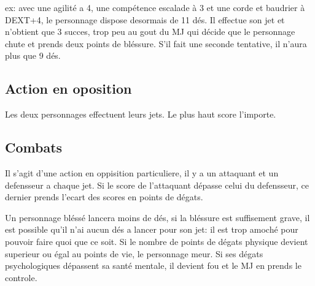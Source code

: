 \documentclass[a4paper,twocolumn]{article}
\begin{document}
ex: avec une agilité a 4, une compétence escalade à 3 et une corde et baudrier à DEXT+4, le personnage dispose desormais de 11 dés. Il effectue son jet et n'obtient que 3 succes, trop peu au gout du MJ qui décide que le personnage chute et prends deux points de bléssure. S'il fait une seconde tentative, il n'aura plus que 9 dés.

\subsection{Action en oposition}
Les deux personnages effectuent leurs jets. Le plus haut score l'importe.

\subsection{Combats}
Il s'agit d'une action en oppisition particuliere, il y a un attaquant et un defensseur a chaque jet. Si le score de l'attaquant dépasse celui du defensseur, ce dernier prends l'ecart des scores en points de dégats.

Un personnage bléssé lancera moins de dés, si la bléssure est suffisement grave, il est possible qu'il n'ai aucun dés a lancer pour son jet: il est trop amoché pour pouvoir faire quoi que ce soit. Si le nombre de points de dégats physique devient superieur ou égal au points de vie, le personnage meur. Si ses dégats psychologiques dépassent sa santé mentale, il devient fou et le MJ en prends le controle.


 
\pagebreak
	
\end{document}
